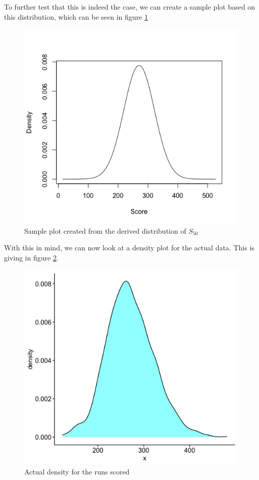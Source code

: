 To further test that this is indeed the case, we can create a sample plot based on this distribution, which can be seen in figure \ref{samplenorm}

\begin{figure}[h]
    \label{samplenorm}
    \centering
    \includegraphics[scale=0.5]{figures/samplenorm.png}
    \caption{Sample plot created from the derived distribution of $S_{50}$}
\end{figure}

With this in mind, we can now look at a density plot for the actual data. This is giving in figure \ref{runsdens}.

\begin{figure}[h]
    \label{runsdens}
    \centering
    \includegraphics[scale=0.45]{figures/runsdensity.png}
    \caption{Actual density for the runs scored}
\end{figure}

